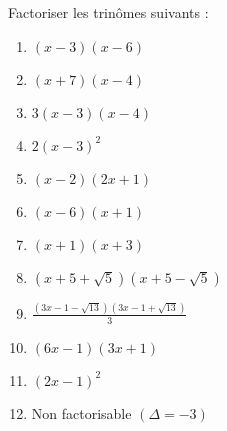 \begin{solution}
Factoriser les trinômes suivants :
\begin{multicols}{2}
\begin{enumerate}
\item $\left( x-3 \right)\left( x-6 \right)$
\item $\left( x+7 \right)\left( x-4 \right)$
\item $3\left( x-3 \right)\left( x-4 \right)$
\item $2{{\left( x-3 \right)}^{2}}$
\item $\left( x-2 \right)\left( 2x+1 \right)$
\item $\left( x-6 \right)\left( x+1 \right)$
\item $\left( x+1 \right)\left( x+3 \right)$
\item $\left( x+5+\sqrt{5} \right)\left( x+5-\sqrt{5} \right)$
\item $\frac{\left( 3x-1-\sqrt{13} \right)\left( 3x-1+\sqrt{13} \right)}{3}$
\item $\left( 6x-1 \right)\left( 3x+1 \right)$
\item ${{\left( 2x-1 \right)}^{2}}$
\item  Non factorisable  $\left( \Delta =-3 \right)$
\end{enumerate}
\end{multicols}
\end{solution}

